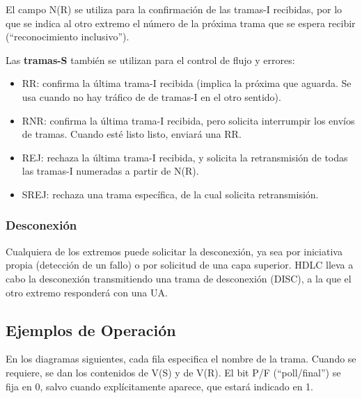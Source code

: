 \documentclass[withindex,glossary]{cam-thesis}
\begin{document}
El campo N(R) se utiliza para la confirmación de las tramas-I recibidas, por lo que se indica al otro extremo el número de la próxima trama que se espera recibir (“reconocimiento inclusivo”). 

Las \textbf{tramas-S} también se utilizan para el control de flujo y errores:
\begin{itemize}
	\item RR: confirma la última trama-I recibida (implica la próxima que aguarda. Se usa cuando no hay tráfico de de tramas-I en el otro sentido).
    \item RNR: confirma la última trama-I recibida, pero solicita interrumpir los envíos de tramas. Cuando esté listo listo, enviará una RR.
    \item REJ: rechaza la última trama-I recibida, y solicita la retransmisión de todas las tramas-I numeradas a partir de N(R).
    \item SREJ: rechaza una trama específica, de la cual solicita retransmisión.
\end{itemize}

\subsubsection{Desconexión}
Cualquiera de los extremos puede solicitar la desconexión, ya sea por iniciativa propia (detección de un fallo) o por solicitud de una capa superior. HDLC lleva a cabo la desconexión transmitiendo una trama de desconexión (DISC), a la que el otro extremo responderá con una UA.

\subsection{Ejemplos de Operación}
En los diagramas siguientes, cada fila especifica el nombre de la trama. Cuando se requiere, se dan los contenidos de V(S) y de V(R). El bit P/F (“poll/final”) se fija en 0, salvo cuando explícitamente aparece, que estará indicado en 1.
\end{document}

